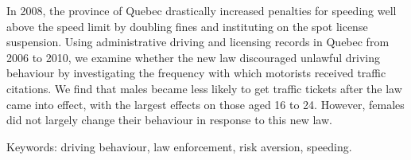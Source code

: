 In 2008, the province of Quebec drastically increased penalties for speeding well above the speed limit by doubling fines and instituting on the spot license suspension. Using administrative driving and licensing records in Quebec from 2006 to 2010, we examine whether the new law discouraged unlawful driving behaviour by investigating the frequency with which motorists received traffic citations. We find that males became less likely to get traffic tickets after the law came into effect, with the largest effects on those aged 16 to 24. However, females did not largely change their behaviour in response to this new law. 

Keywords: driving behaviour, law enforcement, risk aversion, speeding.
